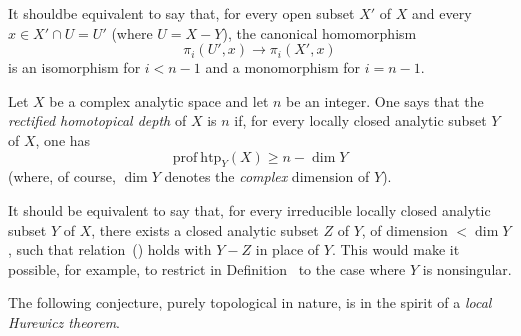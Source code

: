 It should\pageoriginale be equivalent to say that, for every open subset $X'$ of $X$ and every $x\in X'\cap U=U'$ (where $U=X-Y$), the canonical homomorphism
$$
\pi_i(U',x)\to\pi_i(X',x)
$$
is an isomorphism for $i<n-1$ and a monomorphism for $i=n-1$.

\begin{supdefinition} \label{XIII.6.2}
Let $X$ be a complex analytic space and let $n$ be an integer. One says that the \emph{rectified homotopical depth} of $X$ is $n$ if, for every locally closed analytic subset $Y$ of $X$, one has
\begin{equation*} \label{eq:XIII.6.x} \tag{$x$} {\mathrm{prof\:htp}_Y(X)\geq n-\dim Y}
\end{equation*}
(where, of course, $\dim Y$ denotes the \emph{complex} dimension of $Y$).
\end{supdefinition}

It should be equivalent to say that, for every irreducible locally closed analytic subset $Y$ of $X$, there exists a closed analytic subset $Z$ of $Y$, of dimension $<\dim Y$, such that relation~() holds with $Y-Z$ in place of $Y$. This would make it possible, for example, to restrict in Definition~ to the case where $Y$ is nonsingular.

\enlargethispage{\baselineskip}%
The following conjecture, purely topological in nature, is in the spirit of a \og \emph{local Hurewicz theorem}\fg.

